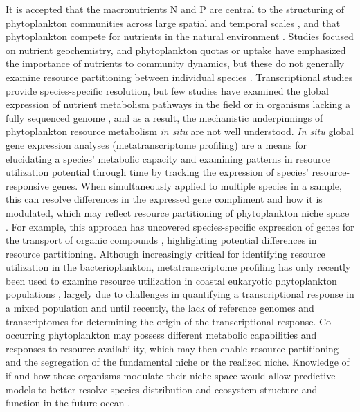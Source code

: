 It is accepted that the macronutrients N and P are central to the structuring of phytoplankton communities across large spatial and temporal scales \citep{Margalef1963, Follows2007, Johnson2006b}, and that phytoplankton compete for nutrients in the natural environment \citep{Sommer1983, Sommer1985}. Studies focused on nutrient geochemistry, and phytoplankton quotas or uptake have emphasized the importance of nutrients to community dynamics, but these do not generally examine resource partitioning between individual species \citep{Hutchins1999, Zubkov2003}. Transcriptional studies provide species-specific resolution, but few studies have examined the global expression of nutrient metabolism pathways in the field \citep{Marchetti2012a} or in organisms lacking a fully sequenced genome \citep{Frischkorn2014, Moustafa2010}, and as a result, the mechanistic underpinnings of phytoplankton resource metabolism \textit{in situ} are not well understood. \textit{In situ} global gene expression analyses (metatranscriptome profiling) are a means for elucidating a species' metabolic capacity and examining patterns in resource utilization potential through time by tracking the expression of species' resource-responsive genes. When simultaneously applied to multiple species in a sample, this can resolve differences in the expressed gene compliment and how it is modulated, which may reflect resource partitioning of phytoplankton niche space \citep{Gifford2013}. For example, this approach has uncovered species-specific expression of genes for the transport of organic compounds \citep{Poretsky2010, Rinta-Kanto2012a, Gifford2011}, highlighting potential differences in resource partitioning. Although increasingly critical for identifying resource utilization in the bacterioplankton, metatranscriptome profiling has only recently been used to examine resource utilization in coastal eukaryotic phytoplankton populations \citep{Dupont2015}, largely due to challenges in quantifying a transcriptional response in a mixed population and until recently, the lack of reference genomes and transcriptomes for determining the origin of the transcriptional response. Co-occurring phytoplankton may possess different metabolic capabilities and responses to resource availability, which may then enable resource partitioning and the segregation of the fundamental niche or the realized niche. Knowledge of if and how these organisms modulate their niche space would allow predictive models to better resolve species distribution and ecosystem structure and function in the future ocean \citep{Follows2007}.\par
